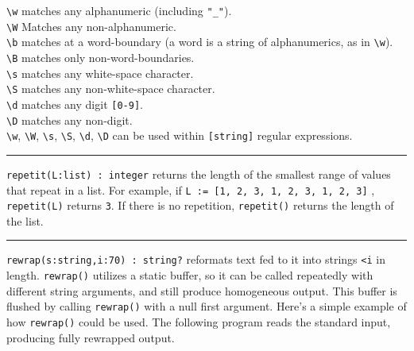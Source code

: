 \texttt{{\textbackslash}w} matches any alphanumeric (including
\texttt{"\_"}).\\
\texttt{{\textbackslash}W} Matches any non-alphanumeric.\\
\texttt{{\textbackslash}b} matches at a word-boundary (a word is
a string of alphanumerics, as in \texttt{{\textbackslash}w}).\\
\texttt{{\textbackslash}B} matches only non-word-boundaries.\\
\texttt{{\textbackslash}s} matches any white-space character.\\
\texttt{{\textbackslash}S} matches any non-white-space
character.\\
\texttt{{\textbackslash}d} matches any digit \texttt{[0-9]}.\\
\texttt{{\textbackslash}D} matches any non-digit.\\
\texttt{{\textbackslash}w}, \texttt{{\textbackslash}W},
\texttt{{\textbackslash}s}, \texttt{{\textbackslash}S},
\texttt{{\textbackslash}d}, \texttt{{\textbackslash}D} can be used
within \texttt{[string]} regular expressions.

\vspace{0.25cm}\hrule{}

\texttt{repetit(L:list) : integer} returns the length of the smallest
range of values that repeat in a list. For example, if \texttt{L := [1, 2, 3,
1, 2, 3, 1, 2, 3]} , \texttt{repetit(L)} returns \texttt{3}. If there is
no repetition, \texttt{repetit()} returns the length of the list. 

\pagebreak

\vspace{0.25cm}\hrule{}

\texttt{rewrap(s:string,i:70) : string?} reformats text fed to it into
strings \texttt{{\textless}i} in length. \texttt{rewrap()} utilizes a
static buffer, so it can be called repeatedly with different string
arguments, and still produce homogeneous output. This buffer is flushed
by calling \texttt{rewrap()} with a null first argument.
Here's a simple example of how \texttt{rewrap()} could
be used. The following program reads the standard input, producing
fully rewrapped output.


